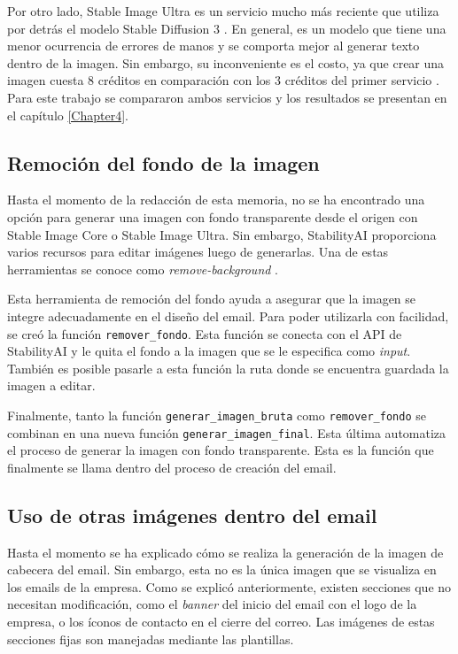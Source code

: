 Por otro lado, Stable Image Ultra es un servicio mucho más reciente que utiliza por detrás el modelo Stable Diffusion 3 \cite{StableDiffusion3}. En general, es un modelo que tiene una menor ocurrencia de errores de manos y se comporta mejor al generar texto dentro de la imagen. Sin embargo, su inconveniente es el costo, ya que crear una imagen cuesta 8 créditos en comparación con los 3 créditos del primer servicio \cite{StabilityAIPricing}. Para este trabajo se compararon ambos servicios y los resultados se presentan en el capítulo \ref{Chapter4}.

\subsection{Remoción del fondo de la imagen}

Hasta el momento de la redacción de esta memoria, no se ha encontrado una opción para generar una imagen con fondo transparente desde el origen con Stable Image Core o Stable Image Ultra. Sin embargo, StabilityAI proporciona varios recursos para editar imágenes luego de generarlas. Una de estas herramientas se conoce como \textit{remove-background} \cite{stabilityai2023tools}.

Esta herramienta de remoción del fondo ayuda a asegurar que la imagen se integre adecuadamente en el diseño del email. Para poder utilizarla con facilidad, se creó la función \texttt{remover\_fondo}. Esta función se conecta con el API de StabilityAI y le quita el fondo a la imagen que se le especifica como \textit{input}. También es posible pasarle a esta función la ruta donde se encuentra guardada la imagen a editar. 

Finalmente, tanto la función \texttt{generar\_imagen\_bruta} como \texttt{remover\_fondo} se combinan en una nueva función \texttt{generar\_imagen\_final}. Esta última automatiza el proceso de generar la imagen con fondo transparente. Esta es la función que finalmente se llama dentro del proceso de creación del email.

\subsection{Uso de otras imágenes dentro del email}

Hasta el momento se ha explicado cómo se realiza la generación de la imagen de cabecera del email. Sin embargo, esta no es la única imagen que se visualiza en los emails de la empresa. Como se explicó anteriormente, existen secciones que no necesitan modificación, como el \textit{banner} del inicio del email con el logo de la empresa, o los íconos de contacto en el cierre del correo. Las imágenes de estas secciones fijas son manejadas mediante las plantillas.

